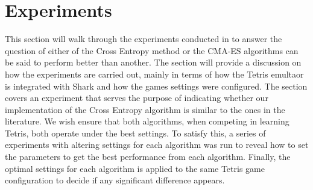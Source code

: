 \section{Experiments}


This section will walk through the experiments conducted in to answer the question 
of either of the Cross Entropy method or the CMA-ES algorithms can be said to perform better
than another. The section will provide a discussion on how the experiments are carried out, mainly
in terms of how the Tetris emultaor is integrated with Shark and how the games settings were configured.
The section covers an experiment that serves the purpose of indicating whether our implementation 
of the Cross Entropy algorithm is similar to the ones in the literature. 
We wish ensure that both algorithms, when competing in learning Tetris, both operate under the 
best settings. To satisfy this, a series of experiments with altering settings for each 
algorithm was run to reveal how to set the parameters to get the best performance from 
each algorithm. Finally, the optimal settings for each algorithm is applied to
the same Tetris game configuration to decide if any significant difference appears.















